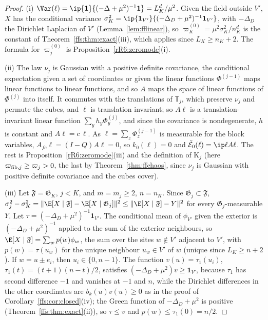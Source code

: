 \begin{proof}
(i) $\Var(\ell)=\ip{\mathbf 1}{(-\Delta+\mu^2)^{-1}\mathbf 1}=L_K^d/\mu^2$.
Given the field outside $V'$, $X$ has the conditional variance $\sigma_K^2=
\ip{\mathbf 1_{V'}}{(-\Delta_D+\mu^2)^{-1}\mathbf 1_{V'}}$, with $-\Delta_D$
the Dirichlet Laplacian of $V'$ (Lemma~\ref{lem:fflinear}), so
$\varpi^{(0)}_K=\mu^2\sigma_K^2/n_K^d$ is the constant of
Theorem~\ref{ffs:thm:exact}(iii), which applies since $L_K\ge n_K+2$. The
formula for $\varpi^{(0)}_j$ is Proposition~\ref{rR6:zeromode}(i).

(ii) The law $\nu_j$ is Gaussian with a positive definite covariance, the
conditional expectation given a set of coordinates or given the linear
functions $\Phi^{(j-1)}$ maps linear functions to linear functions, and so
$A$ maps the space of linear functions of $\Phi^{(j)}$ into itself. It
commutes with the translations of $\mathbb T_j$, which preserve $\nu_j$ and
permute the cubes, and $\ell$ is translation invariant; so $A\ell$ is a
translation-invariant linear function $\sum_yh_y\Phi^{(j)}_y$, and since the
covariance is nondegenerate, $h$ is constant and $A\ell=c\,\ell$. As $\ell=
\sum_z\Phi^{(j-1)}_z$ is measurable for the block variables, $A_{fc}\ell=
(I-Q)A\ell=0$, so $k_0(\ell)=0$ and $\tilde{\mathcal E}_0(\ell)=\ip\ell
{A\ell}$. The rest is Proposition~\ref{rR6:zeromode}(iii) and the
definition of $\mathrm K_j$ (here $\varpi_{{\rm fib},j}\ge\varpi_j>0$, the last by Theorem~\ref{thm:ffchaos}, since $\nu_j$ is Gaussian with positive definite covariance and the cubes cover).

(iii) Let $\mathfrak F=\mathfrak G_K$, $j<K$, and $m=m_j\ge2$, $n=n_K$.
Since $\mathfrak G_j\subset\mathfrak F$, $\sigma_j^2-\sigma_K^2=\lVert\E[X
\mid\mathfrak F]-\E[X\mid\mathfrak G_j]\rVert^2\le\lVert\E[X\mid\mathfrak F]
-Y\rVert^2$ for every $\mathfrak G_j$-measurable $Y$. Let $\tau=(-\Delta_D+
\mu^2)^{-1}\mathbf 1_{V'}$. The conditional mean of $\phi_{V'}$ given the
exterior is $(-\Delta_D+\mu^2)^{-1}$ applied to the sum of the exterior
neighbours, so $\E[X\mid\mathfrak F]=\sum_{w}p(w)\phi_w$, the sum over the
sites $w\notin V'$ adjacent to $V'$, with $p(w)=\tau(u_w)$ for the unique
neighbour $u_w\in V'$ of $w$ (unique since $L_K\ge n+2$). If $w=u\pm e_i$,
then $u_i\in\{0,n-1\}$. The function $v(u)=\tau_1(u_i)$, $\tau_1(t)=(t+1)
(n-t)/2$, satisfies $(-\Delta_D+\mu^2)v\ge\mathbf 1_{V'}$, because $\tau_1$
has second difference $-1$ and vanishes at $-1$ and $n$, while the
Dirichlet differences in the other coordinates are $b_k(u)v(u)\ge0$ as in
the proof of Corollary~\ref{ffs:cor:closed}(iv); the Green function of
$-\Delta_D+\mu^2$ is positive (Theorem~\ref{ffs:thm:exact}(ii)), so $\tau
\le v$ and $p(w)\le\tau_1(0)=n/2$.


\end{proof}
